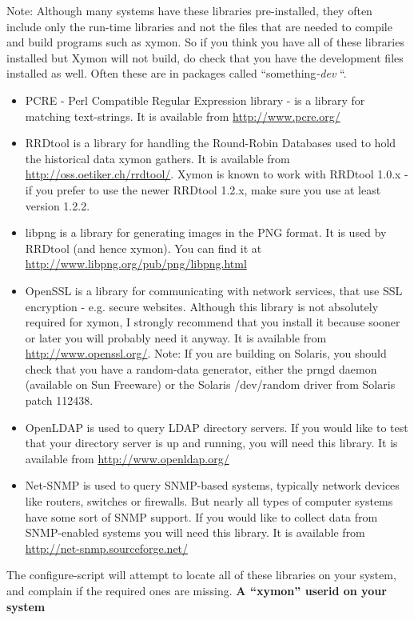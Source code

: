  Note: Although many systems have these libraries pre-installed, they often include only the run-time libraries and not the files that are needed to compile and build programs such as xymon. So if you think you have all of these libraries installed but Xymon will not build, do check that you have the development files installed as well. Often these are in packages called ``something\emph{-dev}
``.
\begin{itemize}
\item PCRE - Perl Compatible Regular Expression library - is a library for matching text-strings. It is available from \url{http://www.pcre.org/}
\item RRDtool is a library for handling the Round-Robin Databases used to hold the historical data xymon gathers. It is available from \url{http://oss.oetiker.ch/rrdtool/}. Xymon is known to work with RRDtool 1.0.x - if you prefer to use the newer RRDtool 1.2.x, make sure you use at least version 1.2.2.
\item libpng is a library for generating images in the PNG format. It is used by RRDtool (and hence xymon). You can find it at \url{http://www.libpng.org/pub/png/libpng.html}
\item OpenSSL is a library for communicating with network services, that use SSL encryption - e.g. secure websites. Although this library is not absolutely required for xymon, I strongly recommend that you install it because sooner or later you will probably need it anyway. It is available from \url{http://www.openssl.org/}. Note: If you are building on Solaris, you should check that you have a random-data generator, either the prngd daemon (available on Sun Freeware) or the Solaris /dev/random driver from Solaris patch 112438.
\item OpenLDAP is used to query LDAP directory servers. If you would like to test that your directory server is up and running, you will need this library. It is available from \url{http://www.openldap.org/}
\item Net-SNMP is used to query SNMP-based systems, typically network devices like routers, switches or firewalls. But nearly all types of computer systems have some sort of SNMP support. If you would like to collect data from SNMP-enabled systems you will need this library. It is available from \url{http://net-snmp.sourceforge.net/}

\end{itemize}


 The configure-script will attempt to locate all of these libraries on your system, and complain if the required ones are missing.
\textbf{A ``xymon'' userid on your system}



